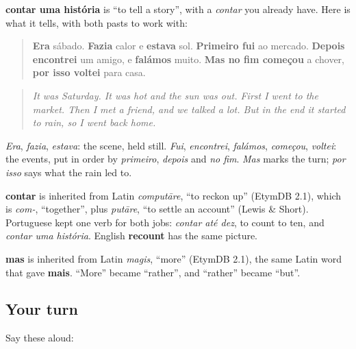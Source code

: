 \begin{grammarlens}[title={Grammar Lens: the backbone of a told story}]
\textbf{contar uma história} is \textquotedblleft{}to tell a story\textquotedblright{}, with a \emph{contar} you already have. Here is what it tells, with both pasts to work with:

\begin{quote}
\textbf{Era} sábado. \textbf{Fazia} calor e \textbf{estava} sol. \textbf{Primeiro fui} ao mercado. \textbf{Depois encontrei} um amigo, e \textbf{falámos} muito. \textbf{Mas no fim começou} a chover, \textbf{por isso voltei} para casa.
\end{quote}

\begin{quote}
\emph{It was Saturday. It was hot and the sun was out. First I went to the market. Then I met a friend, and we talked a lot. But in the end it started to rain, so I went back home.}
\end{quote}

\emph{Era}, \emph{fazia}, \emph{estava}: the scene, held still. \emph{Fui}, \emph{encontrei}, \emph{falámos}, \emph{começou}, \emph{voltei}: the events, put in order by \emph{primeiro}, \emph{depois} and \emph{no fim}. \emph{Mas} marks the turn; \emph{por isso} says what the rain led to.
\end{grammarlens}

\begin{cousinweb}
\textbf{contar} is inherited from Latin \emph{computāre}, \textquotedblleft{}to reckon up\textquotedblright{} (EtymDB 2.1), which is \emph{com-}, \textquotedblleft{}together\textquotedblright{}, plus \emph{putāre}, \textquotedblleft{}to settle an account\textquotedblright{} (Lewis \& Short). Portuguese kept one verb for both jobs: \emph{contar até dez}, to count to ten, and \emph{contar uma história}. English \textbf{recount} has the same picture.

\textbf{mas} is inherited from Latin \emph{magis}, \textquotedblleft{}more\textquotedblright{} (EtymDB 2.1), the same Latin word that gave \textbf{mais}. \textquotedblleft{}More\textquotedblright{} became \textquotedblleft{}rather\textquotedblright{}, and \textquotedblleft{}rather\textquotedblright{} became \textquotedblleft{}but\textquotedblright{}.
\end{cousinweb}

\subsection*{Your turn}
Say these aloud:


